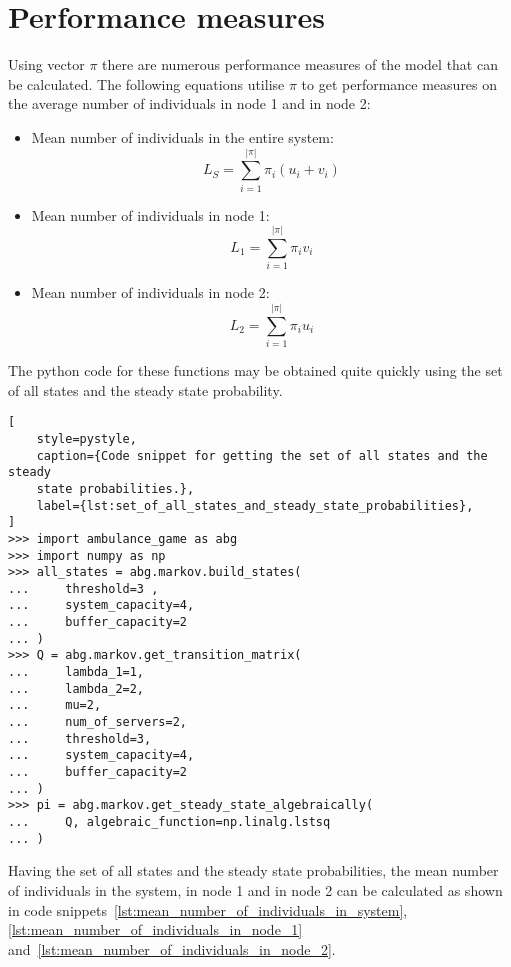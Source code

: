 \section{Performance measures}\label{sec:queueing_performance_measures}
Using vector \(\pi\) there are numerous performance measures of the model that
can be calculated.
The following equations utilise \(\pi\) to get performance measures on the
average number of individuals in node 1 and in node 2:

\begin{itemize}
    \item Mean number of individuals in the entire system:
        \begin{equation}
            L_S = \sum_{i=1}^{|\pi|} \pi_i (u_i + v_i)
        \end{equation}
    \item Mean number of individuals in node 1:
        \begin{equation}
            L_1 = \sum_{i=1}^{|\pi|} \pi_i v_i
        \end{equation}
    \item Mean number of individuals in node 2:
        \begin{equation}
            L_2 = \sum_{i=1}^{|\pi|} \pi_i u_i
        \end{equation}
\end{itemize}

The python code for these functions may be obtained quite quickly using the set
of all states and the steady state probability.

\begin{lstlisting}[
    style=pystyle,
    caption={Code snippet for getting the set of all states and the steady
    state probabilities.},
    label={lst:set_of_all_states_and_steady_state_probabilities},
]
>>> import ambulance_game as abg
>>> import numpy as np
>>> all_states = abg.markov.build_states(
...     threshold=3 ,
...     system_capacity=4,
...     buffer_capacity=2
... )
>>> Q = abg.markov.get_transition_matrix(
...     lambda_1=1,
...     lambda_2=2,
...     mu=2,
...     num_of_servers=2,
...     threshold=3,
...     system_capacity=4,
...     buffer_capacity=2
... )
>>> pi = abg.markov.get_steady_state_algebraically(
...     Q, algebraic_function=np.linalg.lstsq
... )

\end{lstlisting}

Having the set of all states and the steady state probabilities, the mean
number of individuals in the system, in node 1 and in node 2 can be calculated
as shown in code snippets~\ref{lst:mean_number_of_individuals_in_system},
\ref{lst:mean_number_of_individuals_in_node_1}
and~\ref{lst:mean_number_of_individuals_in_node_2}.

